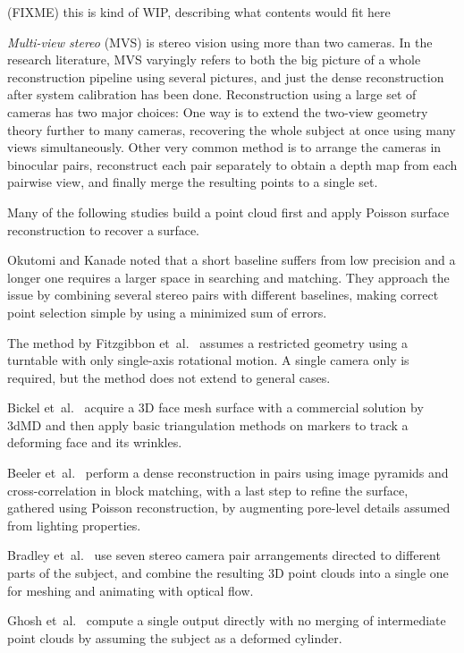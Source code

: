 { \color{red} (FIXME) this is kind of WIP, describing what contents would fit here }

\emph{Multi-view stereo} (MVS) is stereo vision using more than two cameras.
In the research literature, MVS varyingly refers to both the big picture of a whole reconstruction pipeline using several pictures, and just the dense reconstruction after system calibration has been done.
Reconstruction using a large set of cameras has two major choices:
One way is to extend the two-view geometry theory further to many cameras, recovering the whole subject at once using many views simultaneously.
Other very common method is to arrange the cameras in binocular pairs, reconstruct each pair separately to obtain a depth map from each pairwise view, and finally merge the resulting points to a single set.

Many of the following studies build a point cloud first and apply Poisson surface reconstruction \cite{kazhdan2006poisson} to recover a surface.

Okutomi and Kanade \cite{okutomi1993multiple} noted that a short baseline suffers from low precision and a longer one requires a larger space in searching and matching.
They approach the issue by combining several stereo pairs with different baselines, making correct point selection simple by using a minimized sum of errors.

The method by Fitzgibbon et~al.\ \cite{fitzgibbon1998automatic} assumes a restricted geometry using a turntable with only single-axis rotational motion.
A single camera only is required, but the method does not extend to general cases.

Bickel et~al.\ \cite{bickel2007multi} acquire a 3D face mesh surface with a commercial solution by 3dMD \cite{3dmd} and then apply basic triangulation methods on markers to track a deforming face and its wrinkles.

Beeler et~al.\ \cite{beeler2010high} perform a dense reconstruction in pairs using image pyramids and cross-correlation in block matching, with a last step to refine the surface, gathered using Poisson reconstruction, by augmenting pore-level details assumed from lighting properties.

Bradley et~al.\ \cite{bradley2008markerless,bradley2010high} use seven stereo camera pair arrangements directed to different parts of the subject, and combine the resulting 3D point clouds into a single one for meshing and animating with optical flow.

Ghosh et~al.\ \cite{ghosh2011multiview} compute a single output directly with no merging of intermediate point clouds by assuming the subject as a deformed cylinder.

